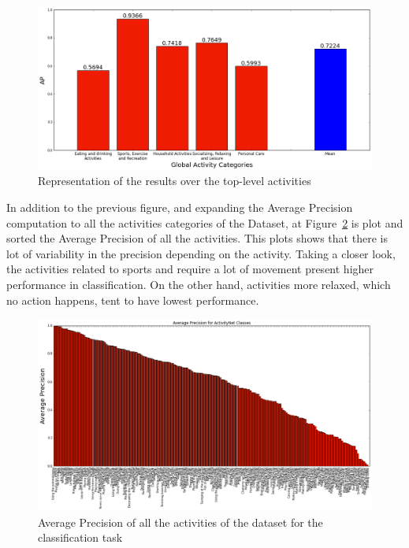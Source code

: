 \begin{figure}[H]
\begin{center}
\includegraphics[width=1\linewidth]{img/results/top_activities_classification_ap}
\end{center}
\caption{Representation of the results over the top-level activities}
\label{fig:top_level_classification_ap}
\end{figure}

In addition to the previous figure, and expanding the Average Precision computation to all the activities categories of the Dataset, at Figure~\ref{fig:ap_by_activity_classification} is plot and sorted the Average Precision of all the activities. This plots shows that there is lot of variability in the precision depending on the activity. Taking a closer look, the activities related to sports and require a lot of movement present higher performance in classification. On the other hand, activities more relaxed, which no action happens, tent to have lowest performance.


\begin{figure}[H]
\begin{center}
\includegraphics[width=1\linewidth]{img/results/ap_by_activity_classification}
\end{center}
\caption{Average Precision of all the activities of the dataset for the classification task}
\label{fig:ap_by_activity_classification}
\end{figure}

